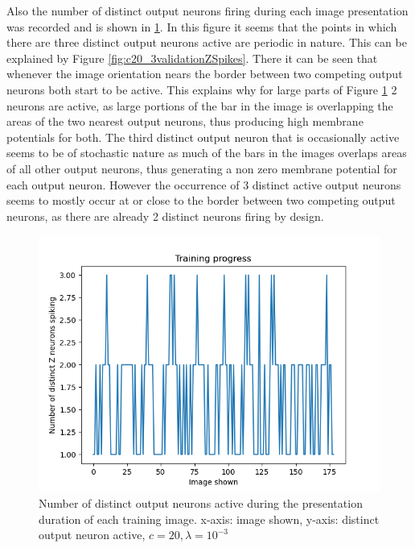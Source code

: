 Also the number of distinct output neurons firing during each image presentation was recorded and is shown in \ref{fig:c20_3validationDistinctZSpikes}. In this figure it seems that the points in which there are three distinct output neurons active are periodic in nature. This can be explained by Figure \ref{fig:c20_3validationZSpikes}. There it can be seen that whenever the image orientation nears the border between two competing output neurons both start to be active. This explains why for large parts of Figure \ref{fig:c20_3validationDistinctZSpikes} 2 neurons are active, as large portions of the bar in the image is overlapping the areas of the two nearest output neurons, thus producing high membrane potentials for both. The third distinct output neuron that is occasionally active seems to be of stochastic nature as much of the bars in the images overlaps areas of all other output neurons, thus generating a non zero membrane potential for each output neuron. However the occurrence of 3 distinct active output neurons seems to mostly occur at or close to the border between two competing output neurons, as there are already 2 distinct neurons firing by design.

\begin{figure}
  \includegraphics[width=\linewidth]{figures/angleNetwork/c20_3validationDistinctZSpikes.png}
  \caption{Number of distinct output neurons active during the presentation duration of each training image. x-axis: image shown, y-axis: distinct output neuron active, $c = 20, \lambda = 10^{-3}$}
  \label{fig:c20_3validationDistinctZSpikes}
\end{figure}

